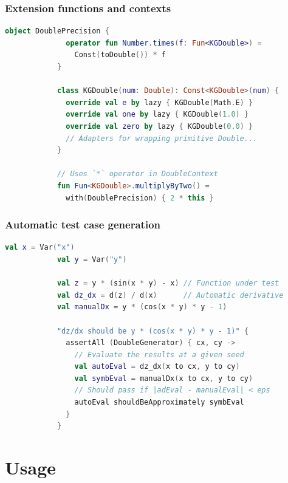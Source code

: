 \documentclass{beamer}
\begin{document}
    \begin{frame}[fragile]
        \frametitle{Extension functions and contexts}
        \begin{lstlisting}[language=Kotlin, gobble=12]
            object DoublePrecision {
              operator fun Number.times(f: Fun<KGDouble>) =
                Const(toDouble()) * f
            }

            class KGDouble(num: Double): Const<KGDouble>(num) {
              override val e by lazy { KGDouble(Math.E) }
              override val one by lazy { KGDouble(1.0) }
              override val zero by lazy { KGDouble(0.0) }
              // Adapters for wrapping primitive Double...
            }

            // Uses `*` operator in DoubleContext
            fun Fun<KGDouble>.multiplyByTwo() =
              with(DoublePrecision) { 2 * this }
        \end{lstlisting}
    \end{frame}

    \begin{frame}[fragile]
        \frametitle{Automatic test case generation}
        \begin{lstlisting}[language=Kotlin, gobble=12]
            val x = Var("x")
            val y = Var("y")

            val z = y * (sin(x * y) - x) // Function under test
            val dz_dx = d(z) / d(x)      // Automatic derivative
            val manualDx = y * (cos(x * y) * y - 1)

            "dz/dx should be y * (cos(x * y) * y - 1)" {
              assertAll (DoubleGenerator) { cx, cy ->
                // Evaluate the results at a given seed
                val autoEval = dz_dx(x to cx, y to cy)
                val symbEval = manualDx(x to cx, y to cy)
                // Should pass if |adEval - manualEval| < eps
                autoEval shouldBeApproximately symbEval
              }
            }
        \end{lstlisting}
    \end{frame}

    \section{Usage}\label{sec:fourth-section}
\end{document}
